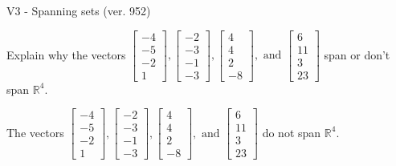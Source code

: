 \begin{exercise}
  \begin{exerciseTitle}V3 - Spanning sets (ver. 952)\end{exerciseTitle}
  \begin{exerciseStatement}
    Explain why the vectors \(\left[\begin{array}{r}
-4 \\
-5 \\
-2 \\
1
\end{array}\right] , \left[\begin{array}{r}
-2 \\
-3 \\
-1 \\
-3
\end{array}\right] , \left[\begin{array}{r}
4 \\
4 \\
2 \\
-8
\end{array}\right] , \text{ and } \left[\begin{array}{r}
6 \\
11 \\
3 \\
23
\end{array}\right]\) span or don't span \(\mathbb{R}^4\). 
	


  \end{exerciseStatement}
  \begin{exerciseAnswer}
   The vectors \(\left[\begin{array}{r}
-4 \\
-5 \\
-2 \\
1
\end{array}\right] , \left[\begin{array}{r}
-2 \\
-3 \\
-1 \\
-3
\end{array}\right] , \left[\begin{array}{r}
4 \\
4 \\
2 \\
-8
\end{array}\right] , \text{ and } \left[\begin{array}{r}
6 \\
11 \\
3 \\
23
\end{array}\right]\) 
  	 do not  
	span \(\mathbb{R}^4\).
  


  \end{exerciseAnswer}
\end{exercise}